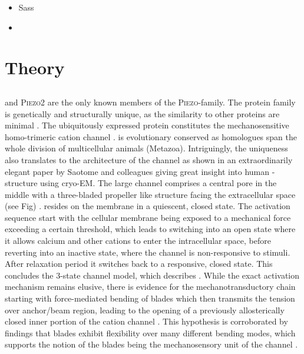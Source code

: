 \begin{itemize}
	\item Sass
	\item 
\end{itemize}


\section{Theory}

\subsection{\Piezo{}}



\Piezo{} and \textsc{Piezo2} are the only known members of the \textsc{Piezo}-family. 
The protein family is genetically and structurally unique, as the similarity to other proteins are minimal \cite{Coste2010}. 
The ubiquitously expressed protein \Piezo{} constitutes the mechanosensitive homo-trimeric cation channel \Piezo{} \cite{Zhao2018}. \Piezo{} is evolutionary conserved as homologues span the whole division of multicellular animals (Metazoa). Intriguingly, the uniqueness also translates to the architecture of the channel as shown in an extraordinarily elegant paper by Saotome and colleagues giving great insight into human \Piezo{}-structure using cryo-EM. The large channel comprises a central pore in the middle with a three-bladed propeller like structure facing the extracellular space (see Fig) \cite{Saotome2018}. \Piezo{} resides on the membrane in a quiescent, closed state. The activation sequence start with the cellular membrane being exposed to a mechanical force exceeding a certain threshold, which leads to \Piezo{} switching into an open state where it allows calcium and other cations to enter the intracellular space, before reverting into an inactive state, where the channel is non-responsive to stimuli. After relaxation period it switches back to a responsive, closed state. This concludes the 3-state channel model, which describes \Piezo{}. While the exact activation mechanism remains elusive, there is evidence for the mechanotransductory chain starting with force-mediated bending of blades which then transmits the tension over anchor/beam region, leading to the opening of a previously allosterically closed inner portion of the cation channel \cite{Zhao2018}. This hypothesis is corroborated by findings that blades exhibit flexibility over many different bending modes, which supports the notion of the blades being the mechanosensory unit of the channel \cite{Ge2015}. 
